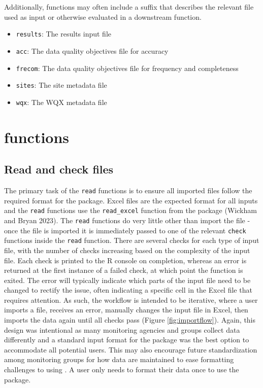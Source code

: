 Additionally, functions may often include a suffix that describes the relevant file used as input or otherwise evaluated in a downstream function.

\begin{itemize}
\tightlist
\item
  \texttt{results}: The results input file
\item
  \texttt{acc}: The data quality objectives file for accuracy
\item
  \texttt{frecom}: The data quality objectives file for frequency and completeness
\item
  \texttt{sites}: The site metadata file
\item
  \texttt{wqx}: The WQX metadata file
\end{itemize}

\hypertarget{functions}{%
\section{\texorpdfstring{ functions}{ functions}}\label{functions}}

\hypertarget{read-and-check-files}{%
\subsection{Read and check files}\label{read-and-check-files}}

The primary task of the \texttt{read} functions is to ensure all imported files follow the required format for the package. Excel files are the expected format for all inputs and the \texttt{read} functions use the \texttt{read\_excel} function from the  package (Wickham and Bryan 2023). The \texttt{read} functions do very little other than import the file - once the file is imported it is immediately passed to one of the relevant \texttt{check} functions inside the \texttt{read} function. There are several checks for each type of input file, with the number of checks increasing based on the complexity of the input file. Each check is printed to the R console on completion, whereas an error is returned at the first instance of a failed check, at which point the function is exited. The error will typically indicate which parts of the input file need to be changed to rectify the issue, often indicating a specific cell in the Excel file that requires attention. As such, the workflow is intended to be iterative, where a user imports a file, receives an error, manually changes the input file in Excel, then imports the data again until all checks pass (Figure \ref{fig:importflow}). Again, this design was intentional as many monitoring agencies and groups collect data differently and a standard input format for the package was the best option to accommodate all potential users. This may also encourage future standardization among monitoring groups for how data are maintained to ease formatting challenges to using . A user only needs to format their data once to use the package.

